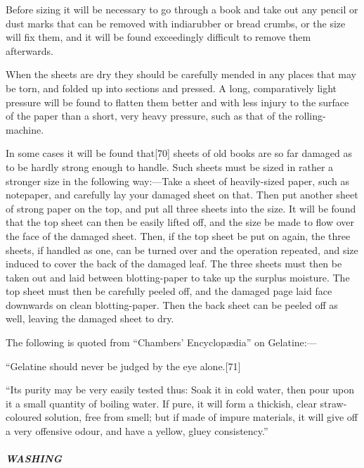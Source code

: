 \documentclass[
]{article}
\begin{document}
Before sizing it will be necessary to go through a book and take out any
pencil or dust marks that can be removed with indiarubber or bread
crumbs, or the size will fix them, and it will be found exceedingly
difficult to remove them afterwards.

When the sheets are dry they should be carefully mended in any places
that may be torn, and folded up into sections and pressed. A long,
comparatively light pressure will be found to flatten them better and
with less injury to the surface of the paper than a short, very heavy
pressure, such as that of the rolling-machine.

In some cases it will be found
that{\protect\hypertarget{Page_70}{}{{[}70{]}}} sheets of old books are
so far damaged as to be hardly strong enough to handle. Such sheets must
be sized in rather a stronger size in the following way:---Take a sheet
of heavily-sized paper, such as notepaper, and carefully lay your
damaged sheet on that. Then put another sheet of strong paper on the
top, and put all three sheets into the size. It will be found that the
top sheet can then be easily lifted off, and the size be made to flow
over the face of the damaged sheet. Then, if the top sheet be put on
again, the three sheets, if handled as one, can be turned over and the
operation repeated, and size induced to cover the back of the damaged
leaf. The three sheets must then be taken out and laid between
blotting-paper to take up the surplus moisture. The top sheet must then
be carefully peeled off, and the damaged page laid face downwards on
clean blotting-paper. Then the back sheet can be peeled off as well,
leaving the damaged sheet to dry.

The following is quoted from ``Chambers' Encyclopædia'' on Gelatine:---

``Gelatine should never be judged by the eye
alone.{\protect\hypertarget{Page_71}{}{{[}71{]}}}

``Its purity may be very easily tested thus: Soak it in cold water, then
pour upon it a small quantity of boiling water. If pure, it will form a
thickish, clear straw-coloured solution, free from smell; but if made of
impure materials, it will give off a very offensive odour, and have a
yellow, gluey consistency.''

\hypertarget{washing}{%
\subparagraph{WASHING}\label{washing}}
\end{document}
